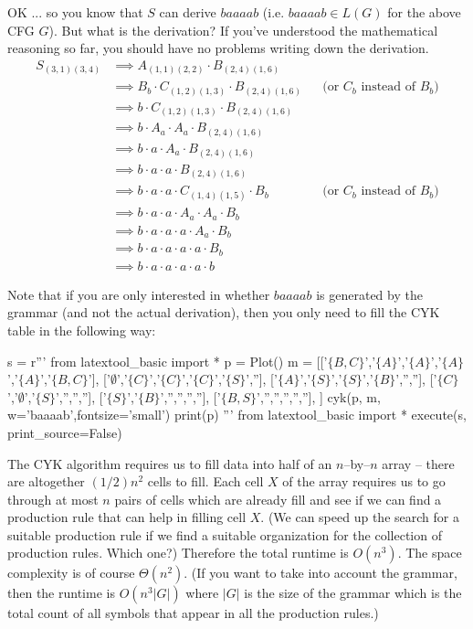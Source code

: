 OK ... so you know that $S$ can derive $baaaab$ (i.e.
$baaaab \in L(G)$ for the above CFG $G$).
But what is the derivation?
If you've understood the mathematical reasoning so far,
you should have no problems writing down the derivation.
\newcommand\ddd{&\implies}
\begin{align*}
  S_{(3,1)(3,4)}
  &\implies A_{(1,1)(2,2)} \cdot B_{(2,4)(1,6)} \\
  &\implies B_b \cdot C_{(1,2)(1,3)} \cdot B_{(2,4)(1,6)} & & \text{(or $C_b$ instead of $B_b$)} \\
  &\implies b \cdot C_{(1,2)(1,3)} \cdot B_{(2,4)(1,6)} \\
  &\implies b \cdot A_a \cdot A_a \cdot B_{(2,4)(1,6)} \\
  &\implies b \cdot a \cdot A_a \cdot B_{(2,4)(1,6)} \\
  &\implies b \cdot a \cdot a \cdot B_{(2,4)(1,6)} \\
  &\implies b \cdot a \cdot a \cdot C_{(1,4)(1,5)} \cdot B_b & &  \text{(or $C_b$ instead of $B_b$)} \\
  &\implies b \cdot a \cdot a \cdot A_a \cdot A_a \cdot B_b \\
  &\implies b \cdot a \cdot a \cdot a \cdot A_a \cdot B_b \\
  &\implies b \cdot a \cdot a \cdot a \cdot a \cdot B_b \\
  &\implies b \cdot a \cdot a \cdot a \cdot a \cdot b
\end{align*}

Note that if you are only interested in whether $baaaab$ is generated by the grammar
(and not the actual derivation), then you only need to fill the CYK table in
the following way:
\begin{python}
s = r'''
from latextool_basic import *
p = Plot()
m = [['$\{B,C\}$','$\{A\}$','$\{A\}$','$\{A\}$','$\{A\}$','$\{B,C\}$'],
     ['$\emptyset$','$\{C\}$','$\{C\}$','$\{C\}$','$\{S\}$',''],
     ['$\{A\}$','$\{S\}$','$\{S\}$','$\{B\}$','',''],
     ['$\{C\}$','$\emptyset$','$\{S\}$','','',''],
     ['$\{S\}$','$\{B\}$','','','',''],
     ['$\{B,S\}$','','','','',''],
     ]
cyk(p, m, w='baaaab',fontsize='small')
print(p)
'''
from latextool_basic import *
execute(s, print_source=False)
\end{python}


The CYK algorithm requires us to fill data into half of an $n$--by--$n$
array -- there are altogether $(1/2)n^2$ cells to fill.
Each cell $X$ of the array requires us to go through at most $n$ pairs
of cells which are already fill and see if we can find a production rule
that can help in filling cell $X$.
(We can speed up the search for a suitable production rule
if we find a suitable organization for the collection
of production rules. Which one?)
Therefore the total runtime is $O(n^3)$.
The space complexity is of course $\Theta(n^2)$.
(If you want to take into account the grammar, then the runtime is
$O(n^3 |G|)$ where $|G|$ is the size of the grammar
which is the total count of all symbols that appear
in all the production rules.)


